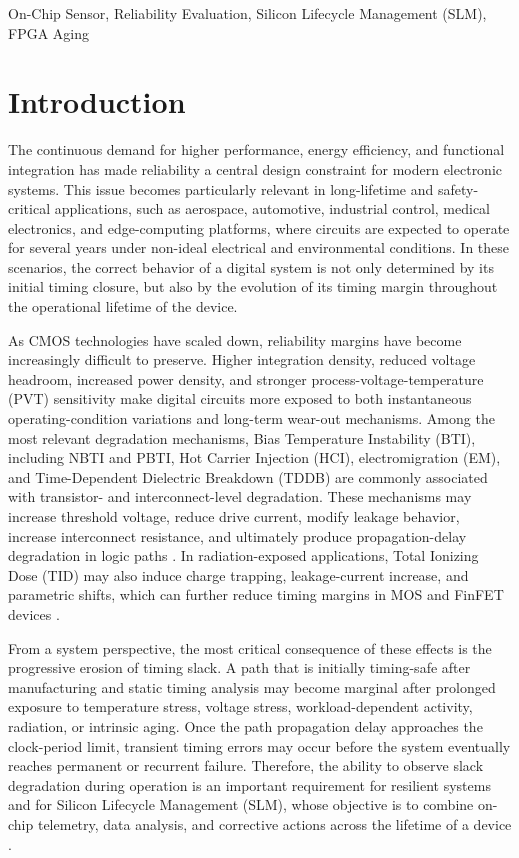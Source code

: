 \documentclass[a4paper,10pt,twoside,twocolumn,final]{JICS_LaTexGuidelines}
\begin{document}
\begin{indexterms}
On-Chip Sensor, Reliability Evaluation, Silicon Lifecycle Management (SLM), FPGA Aging
\end{indexterms}




\section{Introduction}

The continuous demand for higher performance, energy efficiency, and functional integration has made reliability a central design constraint for modern electronic systems. This issue becomes particularly relevant in long-lifetime and safety-critical applications, such as aerospace, automotive, industrial control, medical electronics, and edge-computing platforms, where circuits are expected to operate for several years under non-ideal electrical and environmental conditions. In these scenarios, the correct behavior of a digital system is not only determined by its initial timing closure, but also by the evolution of its timing margin throughout the operational lifetime of the device.

As CMOS technologies have scaled down, reliability margins have become increasingly difficult to preserve. Higher integration density, reduced voltage headroom, increased power density, and stronger process-voltage-temperature (PVT) sensitivity make digital circuits more exposed to both instantaneous operating-condition variations and long-term wear-out mechanisms. Among the most relevant degradation mechanisms, Bias Temperature Instability (BTI), including NBTI and PBTI, Hot Carrier Injection (HCI), electromigration (EM), and Time-Dependent Dielectric Breakdown (TDDB) are commonly associated with transistor- and interconnect-level degradation. These mechanisms may increase threshold voltage, reduce drive current, modify leakage behavior, increase interconnect resistance, and ultimately produce propagation-delay degradation in logic paths \cite{review,Pande2022EMSignalInterconnects,Li2022FPGAAgingPrediction}. In radiation-exposed applications, Total Ionizing Dose (TID) may also induce charge trapping, leakage-current increase, and parametric shifts, which can further reduce timing margins in MOS and FinFET devices \cite{Benfica2016}.

From a system perspective, the most critical consequence of these effects is the progressive erosion of timing slack. A path that is initially timing-safe after manufacturing and static timing analysis may become marginal after prolonged exposure to temperature stress, voltage stress, workload-dependent activity, radiation, or intrinsic aging. Once the path propagation delay approaches the clock-period limit, transient timing errors may occur before the system eventually reaches permanent or recurrent failure. Therefore, the ability to observe slack degradation during operation is an important requirement for resilient systems and for Silicon Lifecycle Management (SLM), whose objective is to combine on-chip telemetry, data analysis, and corrective actions across the lifetime of a device \cite{vargas_and_buff,CNNfabian}.
\end{document}
